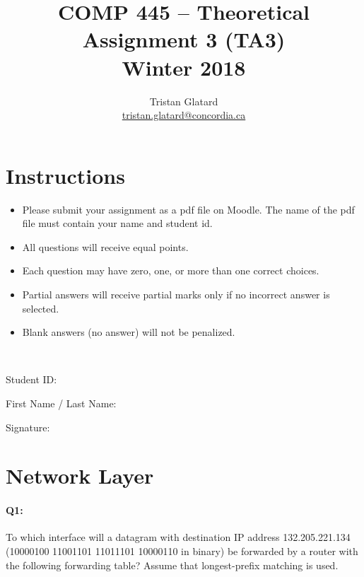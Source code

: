 \documentclass{llncs}
\title{COMP 445 -- Theoretical Assignment 3 (TA3)\\ Winter 2018}
\author{Tristan Glatard\\
  \href{mailto:tristan.glatard@concordia.ca}{tristan.glatard@concordia.ca}
}
\institute{Concordia University\\
  Department of Computer Science and Software Engineering}
\newcommand{\myspace}[0]{\vspace*{0.25cm}}
\begin{document}
\maketitle

\section*{Instructions}

\begin{itemize}
\item Please submit your assignment  as a pdf file on Moodle. The name of the pdf file must contain your name and student id. 
\item All questions will receive equal points.
\item Each question may have zero, one, or more than one
  correct choices.
\item Partial answers will receive partial marks only if no incorrect answer is selected.
\item Blank answers (no answer) will not be penalized.
\end{itemize}

\hrulefill\\

\myspace

\myspace

Student ID: \dotfill

\myspace

\myspace

First Name / Last Name: \dotfill

\myspace

\myspace

Signature: \dotfill

\myspace

\myspace

\hrulefill

\newpage

\section*{Network Layer}

\vfill
\paragraph{\textbf{Q1:}}
To which interface will a datagram with destination IP address
132.205.221.134 (10000100 11001101 11011101 10000110 in binary) be
forwarded by a router with the following forwarding table? Assume that longest-prefix matching is used.
\end{document}
